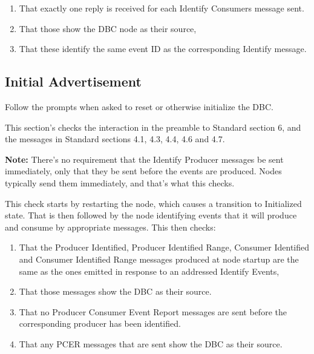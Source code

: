 \begin{enumerate}
\item That exactly one reply is received for each Identify Consumers message sent.
\item That those show the DBC node as their source,
\item That these identify the same event ID as the corresponding Identify message.
\end{enumerate}

\subsection{Initial Advertisement}

Follow the prompts when asked to reset or otherwise initialize the DBC.

This section's checks the interaction in the preamble to Standard section 6, and
the messages in Standard sections 4.1, 4.3, 4.4, 4.6 and 4.7.

\textbf{Note:}  There's no requirement that the Identify Producer messages
be sent immediately, only that they be sent before the events are produced.
Nodes typically send them immediately, and that's what this checks.

This check starts by restarting the node, which causes a transition to Initialized
state.  That is then followed by the node identifying events that it will 
produce and consume by appropriate messages. This then checks:

\begin{enumerate}
\item That the Producer Identified, Producer Identified Range, Consumer Identified 
    and Consumer Identified Range messages produced at node startup are the same
    as the ones emitted in response to an addressed Identify Events,
\item That those messages show the DBC as their source.
\item That no Producer Consumer Event Report messages are sent before the 
    corresponding producer has been identified.
\item That any PCER messages that are sent show the DBC as their source.
\end{enumerate}

  
